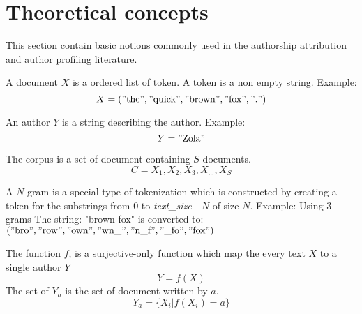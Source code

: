 \section{Theoretical concepts}

This section contain basic notions commonly used in the authorship attribution and author profiling literature.

\begin{definition}[Document]
  A document $X$ is a ordered list of token. A token is a non empty string. Example:
  \begin{equation}
    X = ("\text{the}", "\text{quick}", "\text{brown}", "\text{fox}", "\text{.}")
  \end{equation}
\end{definition}

\begin{definition}[Author]
  An author $Y$ is a string describing the author. Example:
  \begin{equation}
    Y = "\text{Zola}"
  \end{equation}
\end{definition}

\begin{definition}[Corpus]
  The corpus is a set of document containing $S$ documents.
  \begin{equation}
    C = {X_1, X_2, X_3, X_{...}, X_S}
  \end{equation}
\end{definition}

\begin{definition}[$N$-Grams]
  A $N$-gram is a special type of tokenization which is constructed by creating a token for the substrings from $0$ to \textit{text\_size} - $N$ of size $N$.
  Example: Using 3-grams The string: "brown fox" is converted to: \\
  $("\text{bro}", "\text{row}", "\text{own}", "\text{wn\_}", "\text{n\_f}", "\text{\_fo}", "\text{fox}")$
\end{definition}

\begin{definition}
  The function $f$, is a surjective-only function which map the every text $X$ to a single author $Y$
  \begin{equation}
    Y = f(X)
  \end{equation}
  The set of $Y_a$ is the set of document written by $a$.
  \begin{equation}
    Y_a = \{X_i | f(X_i) = a\}
  \end{equation}
\end{definition}

